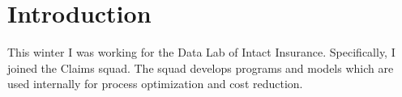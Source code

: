\section{Introduction}
This winter I was working for the Data Lab of Intact Insurance. Specifically, I joined the Claims squad. The squad develops programs and models which are used internally for process optimization and cost reduction.\\

	